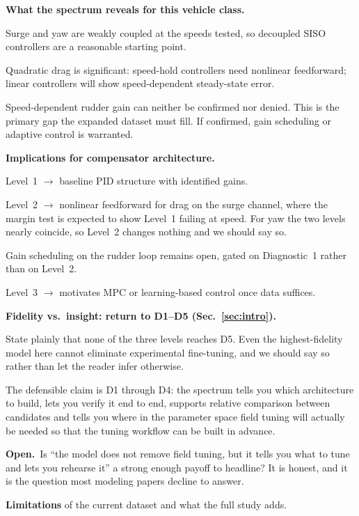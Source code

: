 \documentclass[11pt]{article}
\newcommand{\Open}{\textbf{Open.}\ }
\begin{document}
\begin{outline}
\item \textbf{What the spectrum reveals for this vehicle class.}
  \begin{outline}
  \item Surge and yaw are weakly coupled at the speeds tested, so decoupled SISO
    controllers are a reasonable starting point.
  \item Quadratic drag is significant: speed-hold controllers need nonlinear
    feedforward; linear controllers will show speed-dependent steady-state error.
  \item Speed-dependent rudder gain can neither be confirmed nor denied. This is the
    primary gap the expanded dataset must fill. If confirmed, gain scheduling or
    adaptive control is warranted.
  \end{outline}
\item \textbf{Implications for compensator architecture.}
  \begin{outline}
  \item Level~1 $\rightarrow$ baseline PID structure with identified gains.
  \item Level~2 $\rightarrow$ nonlinear feedforward for drag on the surge channel,
    where the margin test is expected to show Level~1 failing at speed. For yaw the
    two levels nearly coincide, so Level~2 changes nothing and we should say so.
  \item Gain scheduling on the rudder loop remains open, gated on Diagnostic~1 rather
    than on Level~2.
  \item Level~3 $\rightarrow$ motivates MPC or learning-based control once data
    suffices.
  \end{outline}
\item \textbf{Fidelity vs.\ insight: return to D1--D5 (Sec.~\ref{sec:intro}).}
  \begin{outline}
  \item State plainly that none of the three levels reaches D5. Even the
    highest-fidelity model here cannot eliminate experimental fine-tuning, and we
    should say so rather than let the reader infer otherwise.
  \item The defensible claim is D1 through D4: the spectrum tells you which
    architecture to build, lets you verify it end to end, supports relative
    comparison between candidates and tells you where in the parameter space field
    tuning will actually be needed so that the tuning workflow can be built in
    advance.
  \item \Open Is ``the model does not remove field tuning, but it tells you what to
    tune and lets you rehearse it'' a strong enough payoff to headline? It is honest,
    and it is the question most modeling papers decline to answer.
  \end{outline}
\item \textbf{Limitations} of the current dataset and what the full study adds.
\end{outline}
\end{document}

